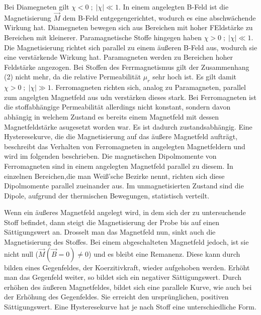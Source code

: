 Bei Diamegneten gilt $\chi <0\; ; \;|\chi|\ll 1$. In einem angelegten B-Feld ist die Magnetisierung $\vec M$ dem B-Feld entgegengerichtet, wodurch es
eine abschwächende Wirkung hat. Diamegneten bewegen sich aus Bereichen mit hoher FEldstärke zu Bereichen mit kleinerer.
Paramagnetische Stoffe hingegen haben $\chi > 0\; ; \;|\chi|\ll 1$. Die Magnetisierung richtet sich parallel zu einem äußeren B-Feld aus,
wodurch sie eine verstärkende Wirkung hat. Paramagneten werden zu Bereichen hoher Feldstärke angezogen.
Bei Stoffen des Ferrmagnetismus gilt der Zusammenhang (2) nicht mehr, da die relative Permeabilität $\mu_r$ sehr hoch ist. Es gilt damit
$\chi > 0\; ; \;|\chi|\gg 1$. Ferromagneten richten sich, analog zu Paramagneten, parallel zum angelgten Magnetfeld aus udn verstärken dieses
stark. 
Bei Ferromagneten ist die stoffabhängige Permeabilität allerdings nicht konstant, sondern davon abhängig in welchem Zustand es bereits
einem Magnetfeld mit dessen Magnetfeldstärke asugesetzt worden war. Es ist dadurch zustandsabhängig.
Eine Hysteresekurve, die die Magnetisierung auf das äußere Magnetfeld aufträgt, beschreibt das Verhalten von Ferromagneten in
angelegten Magnetfeldern und wird im folgenden beschrieben. Die magnetischen Dipolmomente von Ferromagneten sind in einem angelegten
Magnetfeld parallel zu diesem. In einzelnen Bereichen,die man Weiß'sche Bezirke nennt, richten sich diese Dipolmomente parallel zueinander aus.
Im unmagnetisierten Zustand sind die Dipole, aufgrund der thermischen Bewegungen, statistisch verteilt.




Wenn ein äußeres Magnetfeld angelegt wird, in dem sich der zu untersuchende Stoff befindet, dann steigt die Magnetisierung der Probe bis
auf einen Sättigungswert an. Drosselt man das Magnetfeld nun, sinkt auch die Magnetisierung des Stoffes. Bei einem abgeschalteten Magnetfeld jedoch,
ist sie nicht null ($\vec M(\vec B = 0)\neq0$) und es bleibt eine Remanenz.
Diese kann durch bilden eines Gegenfeldes, der Koerzitivkraft, wieder aufgehoben werden. Erhöht man das Gegenfeld weiter, so bildet sich ein 
negativer Sättigungswert.
Durch erhöhen des äußeren Magnetfeldes, bildet sich eine parallele Kurve, wie auch bei der Erhöhung des Gegenfeldes. Sie erreicht den
ursprünglichen, positiven Sättigungswert. Eine Hysteresekurve hat je nach Stoff eine unterschiedliche Form.

